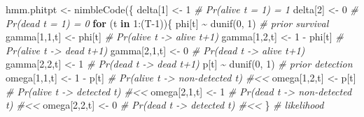 \documentclass[
  12pt,
]{krantz}
\newenvironment{Shaded}{\begin{snugshade}}{\end{snugshade}}
\newcommand{\CommentTok}[1]{\textcolor[rgb]{0.56,0.35,0.01}{\textit{#1}}}
\newcommand{\ControlFlowTok}[1]{\textcolor[rgb]{0.13,0.29,0.53}{\textbf{#1}}}
\newcommand{\DecValTok}[1]{\textcolor[rgb]{0.00,0.00,0.81}{#1}}
\newcommand{\FunctionTok}[1]{\textcolor[rgb]{0.00,0.00,0.00}{#1}}
\newcommand{\NormalTok}[1]{#1}
\newcommand{\OtherTok}[1]{\textcolor[rgb]{0.56,0.35,0.01}{#1}}
\newcommand{\SpecialCharTok}[1]{\textcolor[rgb]{0.00,0.00,0.00}{#1}}
\begin{document}
\begin{Shaded}
\begin{Highlighting}[]
\NormalTok{hmm.phitpt }\OtherTok{\textless{}{-}} \FunctionTok{nimbleCode}\NormalTok{(\{}
\NormalTok{  delta[}\DecValTok{1}\NormalTok{] }\OtherTok{\textless{}{-}} \DecValTok{1}          \CommentTok{\# Pr(alive t = 1) = 1}
\NormalTok{  delta[}\DecValTok{2}\NormalTok{] }\OtherTok{\textless{}{-}} \DecValTok{0}          \CommentTok{\# Pr(dead t = 1) = 0}
  \ControlFlowTok{for}\NormalTok{ (t }\ControlFlowTok{in} \DecValTok{1}\SpecialCharTok{:}\NormalTok{(T}\DecValTok{{-}1}\NormalTok{))\{}
\NormalTok{    phi[t] }\SpecialCharTok{\textasciitilde{}} \FunctionTok{dunif}\NormalTok{(}\DecValTok{0}\NormalTok{, }\DecValTok{1}\NormalTok{) }\CommentTok{\# prior survival}
\NormalTok{    gamma[}\DecValTok{1}\NormalTok{,}\DecValTok{1}\NormalTok{,t] }\OtherTok{\textless{}{-}}\NormalTok{ phi[t]      }\CommentTok{\# Pr(alive t {-}\textgreater{} alive t+1)}
\NormalTok{    gamma[}\DecValTok{1}\NormalTok{,}\DecValTok{2}\NormalTok{,t] }\OtherTok{\textless{}{-}} \DecValTok{1} \SpecialCharTok{{-}}\NormalTok{ phi[t]  }\CommentTok{\# Pr(alive t {-}\textgreater{} dead t+1)}
\NormalTok{    gamma[}\DecValTok{2}\NormalTok{,}\DecValTok{1}\NormalTok{,t] }\OtherTok{\textless{}{-}} \DecValTok{0}        \CommentTok{\# Pr(dead t {-}\textgreater{} alive t+1)}
\NormalTok{    gamma[}\DecValTok{2}\NormalTok{,}\DecValTok{2}\NormalTok{,t] }\OtherTok{\textless{}{-}} \DecValTok{1}        \CommentTok{\# Pr(dead t {-}\textgreater{} dead t+1)}
\NormalTok{    p[t] }\SpecialCharTok{\textasciitilde{}} \FunctionTok{dunif}\NormalTok{(}\DecValTok{0}\NormalTok{, }\DecValTok{1}\NormalTok{) }\CommentTok{\# prior detection}
\NormalTok{    omega[}\DecValTok{1}\NormalTok{,}\DecValTok{1}\NormalTok{,t] }\OtherTok{\textless{}{-}} \DecValTok{1} \SpecialCharTok{{-}}\NormalTok{ p[t]    }\CommentTok{\# Pr(alive t {-}\textgreater{} non{-}detected t) \#\textless{}\textless{}}
\NormalTok{    omega[}\DecValTok{1}\NormalTok{,}\DecValTok{2}\NormalTok{,t] }\OtherTok{\textless{}{-}}\NormalTok{ p[t]        }\CommentTok{\# Pr(alive t {-}\textgreater{} detected t) \#\textless{}\textless{}}
\NormalTok{    omega[}\DecValTok{2}\NormalTok{,}\DecValTok{1}\NormalTok{,t] }\OtherTok{\textless{}{-}} \DecValTok{1}        \CommentTok{\# Pr(dead t {-}\textgreater{} non{-}detected t) \#\textless{}\textless{}}
\NormalTok{    omega[}\DecValTok{2}\NormalTok{,}\DecValTok{2}\NormalTok{,t] }\OtherTok{\textless{}{-}} \DecValTok{0}        \CommentTok{\# Pr(dead t {-}\textgreater{} detected t) \#\textless{}\textless{}}
\NormalTok{  \}}
  \CommentTok{\# likelihood}

\end{Highlighting}
\end{Shaded}
\end{document}
